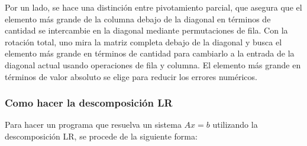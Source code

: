 \documentclass[a4paper,11pt]{article}
\theoremstyle{definition}
\begin{document}
Por un lado, se hace una distinción entre pivotamiento parcial, que asegura que el
elemento más grande de la columna debajo de la diagonal en términos de cantidad se
intercambie en la diagonal mediante permutaciones de fila. Con la rotación total, uno mira la
matriz completa debajo de la diagonal y busca el elemento más grande en términos de
cantidad para cambiarlo a la entrada de la diagonal actual usando operaciones de fila y
columna. El elemento más grande en términos de valor absoluto se elige para reducir los
errores numéricos.

\subsubsection{Como hacer la descomposición LR}
Para hacer un programa que resuelva un sistema $Ax=b$ utilizando la descomposición 
LR, se procede de la siguiente forma:
\end{document}
